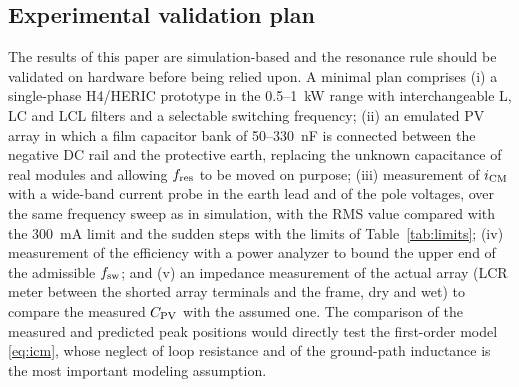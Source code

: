\subsection{Experimental validation plan}
The results of this paper are simulation-based and the resonance rule should be validated on hardware before being relied upon. A minimal plan comprises (i) a single-phase H4/HERIC prototype in the 0.5--1~kW range with interchangeable L, LC and LCL filters and a selectable switching frequency; (ii) an emulated PV array in which a film capacitor bank of 50--330~nF is connected between the negative DC rail and the protective earth, replacing the unknown capacitance of real modules and allowing $f_{\mathrm{res}}$ to be moved on purpose; (iii) measurement of $i_{\mathrm{CM}}$ with a wide-band current probe in the earth lead and of the pole voltages, over the same frequency sweep as in simulation, with the RMS value compared with the 300~mA limit and the sudden steps with the limits of Table~\ref{tab:limits}; (iv) measurement of the efficiency with a power analyzer to bound the upper end of the admissible $f_{\mathrm{sw}}$; and (v) an impedance measurement of the actual array (LCR meter between the shorted array terminals and the frame, dry and wet) to compare the measured $C_{\mathrm{PV}}$ with the assumed one. The comparison of the measured and predicted peak positions would directly test the first-order model \eqref{eq:icm}, whose neglect of loop resistance and of the ground-path inductance is the most important modeling assumption.
